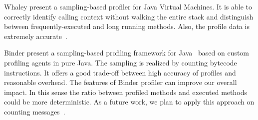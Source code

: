\documentclass{sig-alternate}
\newcommand{\vp}[1]{\nb{Vanessa}{orange}{#1}}
\begin{document}

Whaley present a sampling-based profiler for Java Virtual Machines. It is able to correctly identify calling context without walking the entire stack and distinguish between frequently-executed and long running methods. Also, the profile data is extremely accurate~\cite{Whal00a}. 




Binder present a sampling-based profiling framework for Java~\cite{Bind06a} based on custom profiling agents in pure Java. The sampling is realized by counting bytecode instructions. It offers a good trade-off between high accuracy of profiles and reasonable overhead. The features of Binder profiler can improve our overall impact. In this sense the ratio between profiled methods and executed methods could be more deterministic. As a future work, we plan to apply this approach on counting messages~\cite{Berg11d}.



\end{document}
